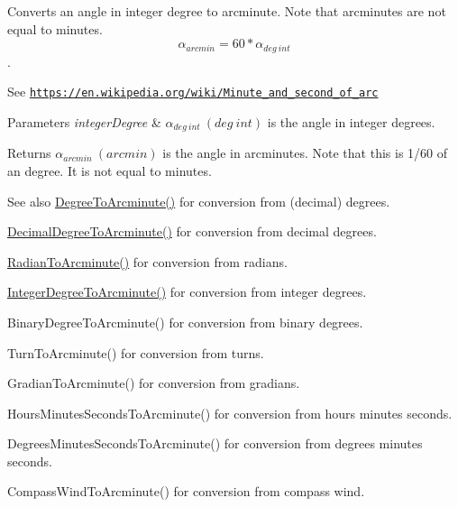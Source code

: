 Converts an angle in integer degree to arcminute. Note that arcminutes are not equal to minutes. \[\alpha_{arcmin}= 60 * \alpha_{deg\ int}\]. 

See \href{https://en.wikipedia.org/wiki/Minute_and_second_of_arc}{\tt https\+://en.\+wikipedia.\+org/wiki/\+Minute\+\_\+and\+\_\+second\+\_\+of\+\_\+arc} 
\begin{DoxyParams}{Parameters}
{\em integer\+Degree} & $\alpha_{deg\ int}\ (deg\ int)$ is the angle in integer degrees. \\
\hline
\end{DoxyParams}
\begin{DoxyReturn}{Returns}
$\alpha_{arcmin}\ (arcmin)$ is the angle in arcminutes. Note that this is 1/60 of an degree. It is not equal to minutes. 
\end{DoxyReturn}
\begin{DoxySeeAlso}{See also}
\mbox{\hyperlink{group___e_g_x_math-_angle_conversions-_degree_ga8abf327dc5f52907b2c881999e9cc43e}{Degree\+To\+Arcminute()}} for conversion from (decimal) degrees. 

\mbox{\hyperlink{group___e_g_x_math-_angle_conversions-_decimal_degree_ga6b6ea6e45d2a13f556824ca419cc9fbd}{Decimal\+Degree\+To\+Arcminute()}} for conversion from decimal degrees. 

\mbox{\hyperlink{group___e_g_x_math-_angle_conversions-_radian_ga722e3b8e78540a6b3942b73b64aeb8d2}{Radian\+To\+Arcminute()}} for conversion from radians. 

\mbox{\hyperlink{group___e_g_x_math-_angle_conversions-_integer_degree_ga78b014e7649d666a3647c467e64e4fe8}{Integer\+Degree\+To\+Arcminute()}} for conversion from integer degrees. 

Binary\+Degree\+To\+Arcminute() for conversion from binary degrees. 

Turn\+To\+Arcminute() for conversion from turns. 

Gradian\+To\+Arcminute() for conversion from gradians. 

Hours\+Minutes\+Seconds\+To\+Arcminute() for conversion from hours minutes seconds. 

Degrees\+Minutes\+Seconds\+To\+Arcminute() for conversion from degrees minutes seconds. 

Compass\+Wind\+To\+Arcminute() for conversion from compass wind. 
\end{DoxySeeAlso}
\mbox{\label{group___e_g_x_math-_angle_conversions-_integer_degree_gaa04058a2fea3dc3678264a05fac6e1ae}} 
